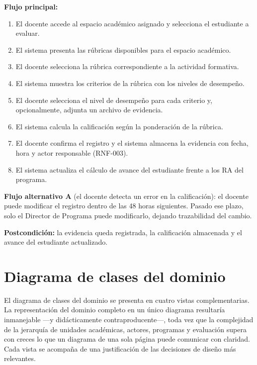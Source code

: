 \textbf{Flujo principal:}
\begin{enumerate}[label=\arabic*.]
  \item El docente accede al espacio académico asignado y selecciona el
    estudiante a evaluar.
  \item El sistema presenta las rúbricas disponibles para el espacio académico.
  \item El docente selecciona la rúbrica correspondiente a la actividad
    formativa.
  \item El sistema muestra los criterios de la rúbrica con los niveles
    de desempeño.
  \item El docente selecciona el nivel de desempeño para cada criterio
    y, opcionalmente, adjunta un archivo de evidencia.
  \item El sistema calcula la calificación según la ponderación de la rúbrica.
  \item El docente confirma el registro y el sistema almacena la evidencia
    con fecha, hora y actor responsable (RNF-003).
  \item El sistema actualiza el cálculo de avance del estudiante frente
    a los RA del programa.
\end{enumerate}

\textbf{Flujo alternativo A} (el docente detecta un error en la calificación):
el docente puede modificar el registro dentro de las 48 horas siguientes.
Pasado ese plazo, solo el Director de Programa puede modificarlo, dejando
trazabilidad del cambio.

\textbf{Postcondición:} la evidencia queda registrada, la calificación
almacenada y el avance del estudiante actualizado.

\section{Diagrama de clases del dominio}
\label{sec:clases-dominio}

El diagrama de clases del dominio se presenta en cuatro vistas complementarias.
La representación del dominio completo en un único diagrama resultaría
inmanejable ---y didácticamente contraproducente---, toda vez que la
complejidad de la jerarquía de unidades académicas, actores, programas
y evaluación supera con creces lo que un diagrama de una sola página puede
comunicar con claridad. Cada vista se acompaña de una justificación
de las decisiones de diseño más relevantes.

